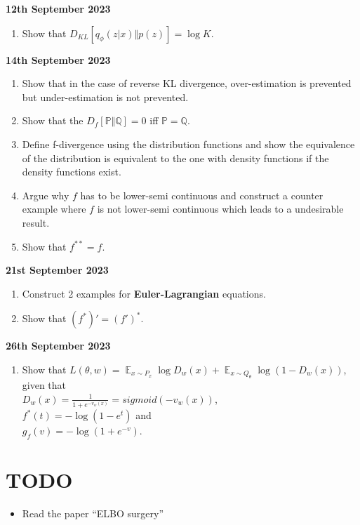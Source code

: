 \documentclass[11pt]{article}
\DeclareMathOperator*{\E}{\mathbb{E}}
\begin{document}
\textbf{12th September 2023}
\begin{enumerate}
\item Show that $D_{KL}\left[ q_{\phi}(z|x) \Vert p(z) \right] = \log K$.
\end{enumerate}

\textbf{14th September 2023}
\begin{enumerate}
\item Show that in the case of reverse KL divergence, over-estimation is prevented but under-estimation is not prevented.
\item Show that the $D_f [\mathbb{P} \Vert \mathbb{Q}] = 0$ iff $\mathbb{P} = \mathbb{Q}$.
\item Define f-divergence using the distribution functions and show the equivalence of the distribution is equivalent to the one with density functions if the density functions exist.
\item Argue why $f$ has to be lower-semi continuous and construct a counter example where $f$ is not lower-semi continuous which leads to a undesirable result.
\item Show that $f^{**} = f$.
\end{enumerate}

\textbf{21st September 2023}
\begin{enumerate}
\item Construct 2 examples for \textbf{Euler-Lagrangian} equations.
\item Show that $(f^{*})' = (f')^{*}$.
\end{enumerate}

\textbf{26th September 2023}
\begin{enumerate}
\item Show that $L(\theta, w) = \E_{x \sim P_x} \log D_w(x) + \E_{x \sim Q_{\theta}} \log (1 - D_w(x))$,
  given that \\
  $D_w(x) = \frac{1}{1 + e^{-v_w(x)}} = sigmoid(-v_w(x))$, \\$f^{*}(t) = - \log (1 - e^t)$
  and \\
  $g_f(v) = - \log (1 + e^{-v})$.
\end{enumerate}

\section{TODO}
\label{sec:todo}

\begin{itemize}
\item Read the paper ``ELBO surgery''
\end{itemize}
\end{document}
